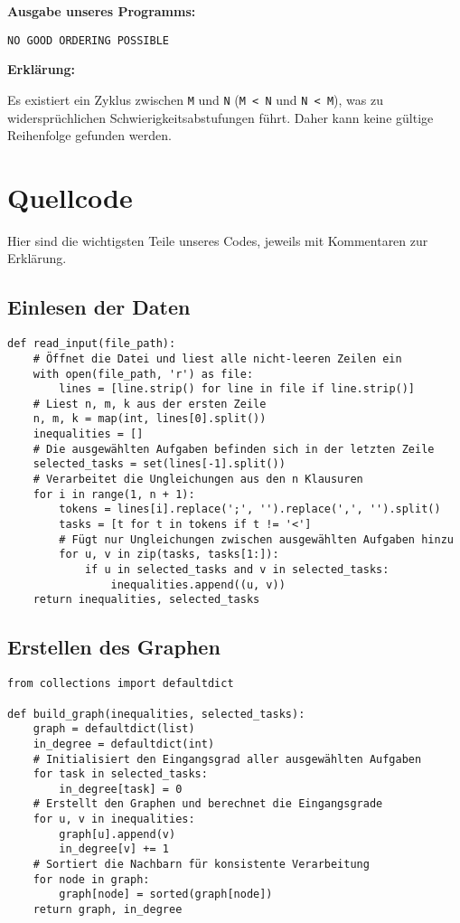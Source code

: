 \documentclass{article}
\begin{document}
\textbf{Ausgabe unseres Programms:}

\begin{verbatim}
NO GOOD ORDERING POSSIBLE
\end{verbatim}

\textbf{Erklärung:}

Es existiert ein Zyklus zwischen \texttt{M} und \texttt{N} (\texttt{M < N} und \texttt{N < M}), was zu widersprüchlichen Schwierigkeitsabstufungen führt. Daher kann keine gültige Reihenfolge gefunden werden.

\section{Quellcode}

Hier sind die wichtigsten Teile unseres Codes, jeweils mit Kommentaren zur Erklärung.

\subsection{Einlesen der Daten}

\begin{lstlisting}[style=custompython]
def read_input(file_path):
    # Öffnet die Datei und liest alle nicht-leeren Zeilen ein
    with open(file_path, 'r') as file:
        lines = [line.strip() for line in file if line.strip()]
    # Liest n, m, k aus der ersten Zeile
    n, m, k = map(int, lines[0].split())
    inequalities = []
    # Die ausgewählten Aufgaben befinden sich in der letzten Zeile
    selected_tasks = set(lines[-1].split())
    # Verarbeitet die Ungleichungen aus den n Klausuren
    for i in range(1, n + 1):
        tokens = lines[i].replace(';', '').replace(',', '').split()
        tasks = [t for t in tokens if t != '<']
        # Fügt nur Ungleichungen zwischen ausgewählten Aufgaben hinzu
        for u, v in zip(tasks, tasks[1:]):
            if u in selected_tasks and v in selected_tasks:
                inequalities.append((u, v))
    return inequalities, selected_tasks
\end{lstlisting}

\subsection{Erstellen des Graphen}

\begin{lstlisting}[style=custompython]
from collections import defaultdict

def build_graph(inequalities, selected_tasks):
    graph = defaultdict(list)
    in_degree = defaultdict(int)
    # Initialisiert den Eingangsgrad aller ausgewählten Aufgaben
    for task in selected_tasks:
        in_degree[task] = 0
    # Erstellt den Graphen und berechnet die Eingangsgrade
    for u, v in inequalities:
        graph[u].append(v)
        in_degree[v] += 1
    # Sortiert die Nachbarn für konsistente Verarbeitung
    for node in graph:
        graph[node] = sorted(graph[node])
    return graph, in_degree
\end{lstlisting}
\end{document}
